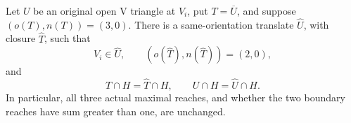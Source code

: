 \begin{proposition}
\label{prop:vd0-exact-trace-normalization}
\label{lem:app-vd0-trace-normalization-calculation}

Let $U$ be an original open V triangle at $V_i$, put $T=\overline U$, and
suppose $(o(T),n(T))=(3,0)$.  There is a same-orientation translate
$\widehat U$, with closure $\widehat T$, such that
\begin{equation}
 V_i\in\widehat U,\qquad (o(\widehat T),n(\widehat T))=(2,0),
 \label{eq:o3-normalized-type}
\end{equation}
and
\begin{equation}
 T\cap H=\widehat T\cap H,\qquad
 U\cap H=\widehat U\cap H.
 \label{eq:o3-exact-traces}
\end{equation}
In particular, all three actual maximal reaches, and whether the two boundary reaches
have sum greater than one, are unchanged.
\end{proposition}
